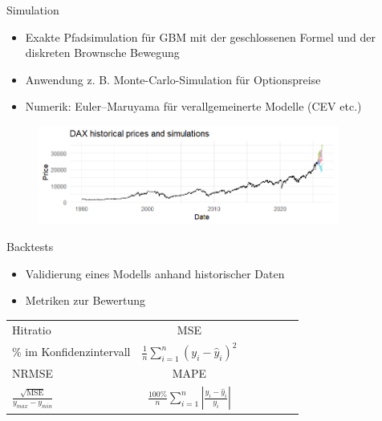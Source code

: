 \documentclass{beamer}
\begin{document}
\begin{frame}{Simulation}
  \begin{itemize}
      \item Exakte Pfadsimulation für GBM mit der geschlossenen Formel und der diskreten Brownsche Bewegung
      \item Anwendung z. B. Monte-Carlo-Simulation für Optionspreise
      \item Numerik: Euler--Maruyama für verallgemeinerte Modelle (CEV etc.)
  \end{itemize}
  \begin{figure}
    \centering
  \includegraphics[width=0.88\textwidth]{../thesis/images/dax_monte_carlo.png}
  \end{figure}
\end{frame}

\begin{frame}{Backtests}
  \begin{itemize}
      \item Validierung eines Modells anhand historischer Daten
      \item Metriken zur Bewertung
  
  \end{itemize}
\begin{table}[H]
\centering
\begin{tabular}{lcccccc}
Hitratio & MSE \\

\% im Konfidenzintervall & $\frac{1}{n} \sum_{i=1}^n (y_i - \hat{y}_i)^2$  \\
\hline
NRMSE & MAPE \\
$\frac{\sqrt{\text{MSE}}}{y_{max} - y_{min}}$ & $\frac{100\%}{n} \sum_{i=1}^n \left|\frac{y_i - \hat{y}_i}{y_i}\right|$ \\

\end{tabular}
\end{table}

\end{frame}
\end{document}
